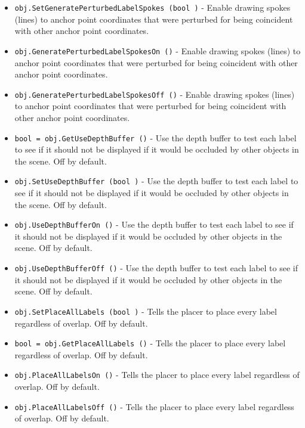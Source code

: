 \begin{itemize}
\item  \verb|obj.SetGeneratePerturbedLabelSpokes (bool )| -  Enable drawing spokes (lines) to anchor point coordinates that were perturbed
 for being coincident with other anchor point coordinates.

\item  \verb|obj.GeneratePerturbedLabelSpokesOn ()| -  Enable drawing spokes (lines) to anchor point coordinates that were perturbed
 for being coincident with other anchor point coordinates.

\item  \verb|obj.GeneratePerturbedLabelSpokesOff ()| -  Enable drawing spokes (lines) to anchor point coordinates that were perturbed
 for being coincident with other anchor point coordinates.

\item  \verb|bool = obj.GetUseDepthBuffer ()| -  Use the depth buffer to test each label to see if it should not be displayed if
 it would be occluded by other objects in the scene. Off by default.

\item  \verb|obj.SetUseDepthBuffer (bool )| -  Use the depth buffer to test each label to see if it should not be displayed if
 it would be occluded by other objects in the scene. Off by default.

\item  \verb|obj.UseDepthBufferOn ()| -  Use the depth buffer to test each label to see if it should not be displayed if
 it would be occluded by other objects in the scene. Off by default.

\item  \verb|obj.UseDepthBufferOff ()| -  Use the depth buffer to test each label to see if it should not be displayed if
 it would be occluded by other objects in the scene. Off by default.

\item  \verb|obj.SetPlaceAllLabels (bool )| -  Tells the placer to place every label regardless of overlap.
 Off by default.

\item  \verb|bool = obj.GetPlaceAllLabels ()| -  Tells the placer to place every label regardless of overlap.
 Off by default.

\item  \verb|obj.PlaceAllLabelsOn ()| -  Tells the placer to place every label regardless of overlap.
 Off by default.

\item  \verb|obj.PlaceAllLabelsOff ()| -  Tells the placer to place every label regardless of overlap.
 Off by default.


\end{itemize}
